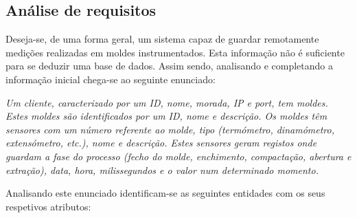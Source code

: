 \documentclass[11pt,twoside,a4paper]{report}
\begin{document}
\subsection{Análise de requisitos}
Deseja-se, de uma forma geral, um sistema capaz de guardar remotamente medições realizadas em moldes instrumentados. Esta informação não é suficiente para se deduzir uma base de dados. Assim sendo, analisando e completando a informação inicial chega-se ao seguinte enunciado:\par 
\textit{Um cliente, caracterizado por um ID, nome, morada, IP e port, tem moldes. Estes moldes são identificados por um ID, nome e descrição. Os moldes têm sensores com um número referente ao molde, tipo (termómetro, dinamómetro, extensómetro, etc.), nome e descrição. Estes sensores geram registos onde guardam a fase do processo (fecho do molde, enchimento, compactação, abertura e extração), data, hora, milissegundos e o valor num determinado momento.}\par 
\vspace{2ex}
Analisando este enunciado identificam-se as seguintes entidades com os seus respetivos atributos:
\end{document}
